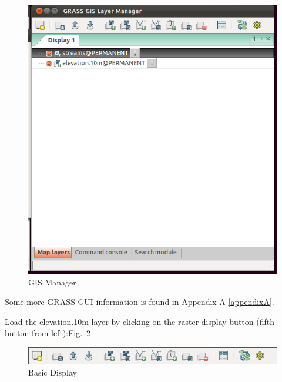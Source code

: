 \begin{figure}[htbp]
   \centering
   \includegraphics[scale=0.35]{grass002.png}
   \caption{GIS Manager}
   \label{fig:grass002}
\end{figure}

Some more GRASS GUI information is found in Appendix A \ref{appendixA}.

Load the elevation.10m layer by clicking on the raster display button
(fifth button from left):Fig.~\ref{fig:grass003}

\begin{figure}[htbp]
   \centering
   \includegraphics[scale=0.5]{grass003.png}
   \caption{Basic Display}
   \label{fig:grass003}
\end{figure}

